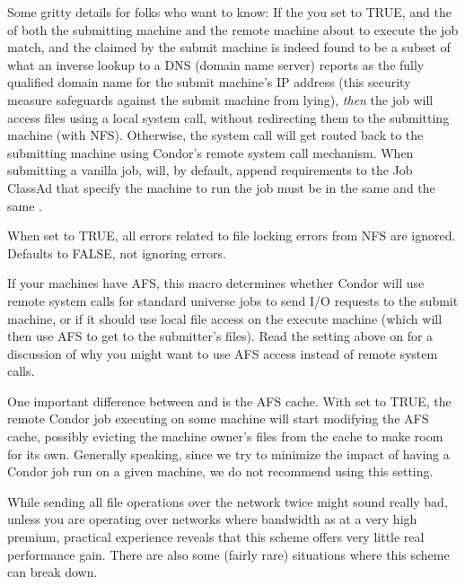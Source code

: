 \begin{description}
  Some gritty details for folks who want to know: If the you set
   to TRUE, and the  of
  both the submitting machine and the remote machine about to execute
  the job match, and the  claimed by the
  submit machine is indeed found to be a subset of what an inverse
  lookup to a DNS (domain name server) reports as the fully qualified
  domain name for the submit machine's IP address (this security
  measure safeguards against the submit machine from lying),
  \emph{then} the job will access files using a local system call,
  without redirecting them to the submitting machine (with
  NFS).  Otherwise, the system call will get routed back to the
  submitting machine using Condor's remote system call mechanism.
  \Note When submitting a vanilla job,  will, by default,
  append requirements to the Job ClassAd that specify the machine to run
  the job must be in the same  and the same
  .

\item[\Macro{IGNORE\_NFS\_LOCK\_ERRORS}] \label{param:IgnoreNFSLockErrors}
  When set to TRUE, all errors related to file locking errors from
  NFS are ignored.
  Defaults to FALSE, not ignoring errors.
  
\item[\Macro{USE\_AFS}] \label{param:UseAfs} If your machines have AFS,
  this
  macro determines whether Condor will use remote system calls for
  standard universe jobs to send I/O requests to the submit machine,
  or if it should use local file access on the execute machine (which
  will then use AFS to get to the submitter's files).  Read the
  setting above on  for a discussion of why you might
  want to use AFS access instead of remote system calls.
  
  One important difference between  and
   is the AFS cache.  With  set to
  TRUE, the remote Condor job executing on some machine will start
  modifying the AFS cache, possibly evicting the machine owner's
  files from the cache to make room for its own.  Generally speaking,
  since we try to minimize the impact of having a Condor job run on a
  given machine, we do not recommend using this setting.

  While sending all file operations over the network twice might sound
  really bad, unless you are operating over networks where bandwidth
  as at a very high premium, practical experience reveals that this
  scheme offers very little real performance gain.  There are also
  some (fairly rare) situations where this scheme can break down.
  

\end{description}
